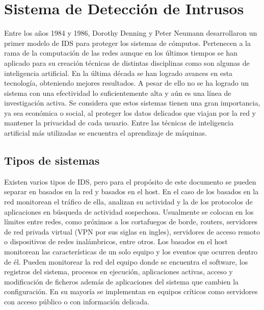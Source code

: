 \chapter{Sistema de Detección de Intrusos}\label{chapter:ids}

Entre los años 1984 y 1986, Dorothy Denning y Peter Neumann desarrollaron un primer modelo de IDS \cite{denning1985requirements} para proteger los sistemas de cómputos. Pertenecen a la rama de la computación de las redes aunque en los últimos tiempos se han aplicado para su creación técnicas de distintas disciplinas como son algunas de inteligencia artificial. En la última década se han logrado avances en esta tecnología, obteniendo mejores resultados. A pesar de ello no se ha logrado un sistema con una efectividad lo suficientemente alta y aún es una línea de investigación activa. Se considera que estos sistemas tienen una gran importancia, ya sea económica o social, al proteger los datos delicados que viajan por la red y mantener la privacidad de cada usuario. Entre las técnicas de inteligencia artificial más utilizadas se encuentra el aprendizaje de máquinas.

\section{Tipos de sistemas}
Existen varios tipos de IDS, pero para el propósito de este documento se pueden separar en basados en la red y basados en el host. En el caso de los basados en la red monitorean el tráfico de ella, analizan su actividad y la de los protocolos de aplicaciones en búsqueda de actividad sospechosa. Usualmente se colocan en los límites entre redes, como próximos a los cortafuegos de borde, routers, servidores de red privada virtual (VPN por sus siglas en ingles), servidores de acceso remoto o dispositivos de redes inalámbricos, entre otros. Los basados en el host monitorean las características de un solo equipo y los eventos que ocurren dentro de él. Pueden monitorear la red del equipo donde se encuentra el software, los registros del sistema, procesos en ejecución, aplicaciones activas, acceso y modificación de ficheros además de aplicaciones del sistema que cambien la configuración. En su mayoría se implementan en equipos críticos como servidores con acceso público o con información delicada.

